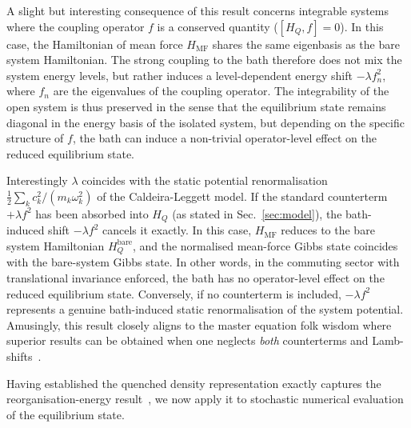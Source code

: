 A slight but interesting consequence of this result concerns integrable systems where the coupling operator $f$ is a conserved quantity ($[H_Q, f]=0$). In this case, the Hamiltonian of mean force $H_{\mathrm{MF}}$ shares the same eigenbasis as the bare system Hamiltonian. The strong coupling to the bath therefore does not mix the system energy levels, but rather induces a level-dependent energy shift $-\lambda f_n^2$, where $f_n$ are the eigenvalues of the coupling operator. The integrability of the open system is thus preserved in the sense that the equilibrium state remains diagonal in the energy basis of the isolated system, but depending on the specific structure of $f$, the bath can induce a non-trivial operator-level effect on the reduced equilibrium state. 

Interestingly $\lambda$ coincides with the static potential renormalisation
$\frac{1}{2}\sum_k c_k^2/(m_k\omega_k^2)$ of the Caldeira-Leggett model. If the standard counterterm $+\lambda f^2$ has been absorbed into $H_Q$ (as stated in Sec.~\ref{sec:model}), the bath-induced shift $-\lambda f^2$ cancels it exactly. In this case, $H_{\mathrm{MF}}$ reduces to the bare system Hamiltonian $H_Q^{\mathrm{bare}}$, and the normalised mean-force Gibbs state coincides with the bare-system Gibbs state. In other words, in the commuting sector with translational invariance enforced, the bath has no operator-level effect on the reduced equilibrium
state. Conversely, if no counterterm is included, $-\lambda f^2$ represents a genuine
bath-induced static renormalisation of the system potential. Amusingly, this result closely aligns to the master equation folk wisdom where superior results can be obtained when one neglects \emph{both} counterterms and Lamb-shifts~\cite{correaPotentialRenormalisationLamb2025}.

Having established the quenched density representation exactly captures the reorganisation-energy result~\cite{campisiTalknerHanggi2009Solvable}, we now apply it to stochastic numerical evaluation of the equilibrium state.

